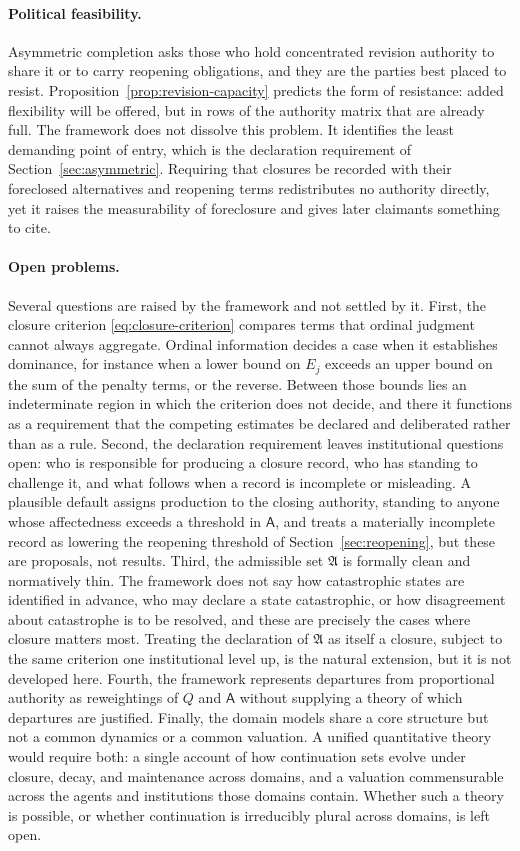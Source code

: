 \paragraph{Political feasibility.} Asymmetric completion asks those who hold concentrated revision authority to share it or to carry reopening obligations, and they are the parties best placed to resist. Proposition~\ref{prop:revision-capacity} predicts the form of resistance: added flexibility will be offered, but in rows of the authority matrix that are already full. The framework does not dissolve this problem. It identifies the least demanding point of entry, which is the declaration requirement of Section~\ref{sec:asymmetric}. Requiring that closures be recorded with their foreclosed alternatives and reopening terms redistributes no authority directly, yet it raises the measurability of foreclosure and gives later claimants something to cite.

\paragraph{Open problems.} Several questions are raised by the framework and not settled by it. First, the closure criterion \eqref{eq:closure-criterion} compares terms that ordinal judgment cannot always aggregate. Ordinal information decides a case when it establishes dominance, for instance when a lower bound on $E_j$ exceeds an upper bound on the sum of the penalty terms, or the reverse. Between those bounds lies an indeterminate region in which the criterion does not decide, and there it functions as a requirement that the competing estimates be declared and deliberated rather than as a rule. Second, the declaration requirement leaves institutional questions open: who is responsible for producing a closure record, who has standing to challenge it, and what follows when a record is incomplete or misleading. A plausible default assigns production to the closing authority, standing to anyone whose affectedness exceeds a threshold in $\mathsf{A}$, and treats a materially incomplete record as lowering the reopening threshold of Section~\ref{sec:reopening}, but these are proposals, not results. Third, the admissible set $\mathfrak{A}$ is formally clean and normatively thin. The framework does not say how catastrophic states are identified in advance, who may declare a state catastrophic, or how disagreement about catastrophe is to be resolved, and these are precisely the cases where closure matters most. Treating the declaration of $\mathfrak{A}$ as itself a closure, subject to the same criterion one institutional level up, is the natural extension, but it is not developed here. Fourth, the framework represents departures from proportional authority as reweightings of $Q$ and $\mathsf{A}$ without supplying a theory of which departures are justified. Finally, the domain models share a core structure but not a common dynamics or a common valuation. A unified quantitative theory would require both: a single account of how continuation sets evolve under closure, decay, and maintenance across domains, and a valuation commensurable across the agents and institutions those domains contain. Whether such a theory is possible, or whether continuation is irreducibly plural across domains, is left open.

